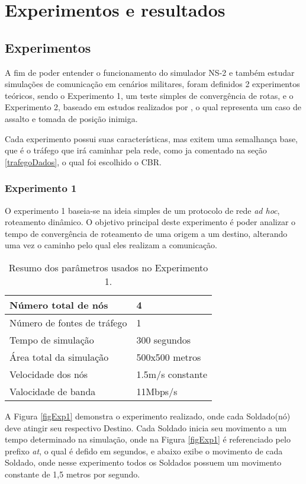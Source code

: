 \section{Experimentos e resultados}
\subsection{Experimentos}
A fim de poder entender o funcionamento do simulador NS-2 e tamb\'em estudar simula\c{c}\~oes de comunica\c{c}\~ao em cen\'arios militares, foram definidos 2 experimentos te\'oricos, sendo o Experimento 1, um teste simples de converg\^encia de rotas, e o Experimento 2, baseado em estudos realizados por \cite{pereira}, o qual representa um caso de assalto e tomada de posi\c{c}\~ao inimiga.

Cada experimento possui suas caracter\'isticas, mas exitem uma semalhan\c{c}a base, que \'e o tr\'afego que ir\'a caminhar pela rede, como ja comentado na se\c{c}\~ao \ref{trafegoDados}, o qual foi escolhido o CBR.

\subsubsection{Experimento 1}
O experimento 1 baseia-se na ideia simples de um protocolo de rede \textit{ad hoc}, roteamento din\^amico.
O objetivo principal deste experimento \'e poder analizar o tempo de converg\^encia de roteamento de uma origem a um destino, alterando uma vez o caminho pelo qual eles realizam a comunica\c{c}\~ao.

\begin{table}[H]
	\centering
	\caption{Resumo dos par\^ametros usados no Experimento 1.}
	\begin{tabular}{ | l | l | }
		\hline
		N\'umero total de n\'os & 4 \\ \hline
		N\'umero de fontes de tr\'afego & 1 \\ \hline
		Tempo de simula\c{c}\~ao & 300 segundos \\ \hline
		\'Area total da simula\c{c}\~ao & 500x500 metros \\ \hline
		Velocidade dos n\'os & 1.5m/s constante \\ \hline
		Valocidade de banda & 11Mbps/s \\ \hline
	\end{tabular}
	\label{tabParamExp1}
\end{table}

A Figura \ref{figExp1} demonstra o experimento realizado, onde cada Soldado(n\'o) deve atingir seu respectivo Destino.
Cada Soldado inicia seu movimento a um tempo determinado na simula\c{c}\~ao, onde na Figura \ref{figExp1} \'e referenciado pelo prefixo \textit{at}, o qual \'e defido em segundos, e abaixo exibe o movimento de cada Soldado, onde nesse experimento todos os Soldados possuem um movimento constante de 1,5 metros por segundo. 

